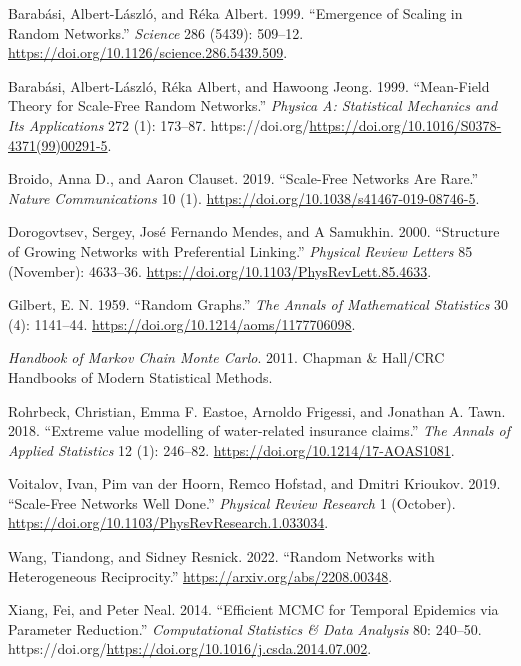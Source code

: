\documentclass[
]{article}
\newlength{\cslhangindent}
\newenvironment{CSLReferences}[2] %
 {\begin{list}{}{%
  \setlength{\itemindent}{0pt}
  \setlength{\leftmargin}{0pt}
  \setlength{\parsep}{0pt}
  \ifodd #1
   \setlength{\leftmargin}{\cslhangindent}
   \setlength{\itemindent}{-1\cslhangindent}
  \fi
  \setlength{\itemsep}{#2\baselineskip}}}
 {\end{list}}
\begin{document}
\label{refs}
\begin{CSLReferences}{1}{0}
Barabási, Albert-László, and Réka Albert. 1999. {``Emergence of Scaling
in Random Networks.''} \emph{Science} 286 (5439): 509--12.
\url{https://doi.org/10.1126/science.286.5439.509}.

Barabási, Albert-László, Réka Albert, and Hawoong Jeong. 1999.
{``Mean-Field Theory for Scale-Free Random Networks.''} \emph{Physica A:
Statistical Mechanics and Its Applications} 272 (1): 173--87.
https://doi.org/\url{https://doi.org/10.1016/S0378-4371(99)00291-5}.

Broido, Anna D., and Aaron Clauset. 2019. {``Scale-Free Networks Are
Rare.''} \emph{Nature Communications} 10 (1).
\url{https://doi.org/10.1038/s41467-019-08746-5}.

Dorogovtsev, Sergey, José Fernando Mendes, and A Samukhin. 2000.
{``Structure of Growing Networks with Preferential Linking.''}
\emph{Physical Review Letters} 85 (November): 4633--36.
\url{https://doi.org/10.1103/PhysRevLett.85.4633}.

Gilbert, E. N. 1959. {``{Random Graphs}.''} \emph{The Annals of
Mathematical Statistics} 30 (4): 1141--44.
\url{https://doi.org/10.1214/aoms/1177706098}.

\emph{Handbook of Markov Chain Monte Carlo}. 2011. Chapman \& Hall/CRC
Handbooks of Modern Statistical Methods.

Rohrbeck, Christian, Emma F. Eastoe, Arnoldo Frigessi, and Jonathan A.
Tawn. 2018. {``{Extreme value modelling of water-related insurance
claims}.''} \emph{The Annals of Applied Statistics} 12 (1): 246--82.
\url{https://doi.org/10.1214/17-AOAS1081}.

Voitalov, Ivan, Pim van der Hoorn, Remco Hofstad, and Dmitri Krioukov.
2019. {``Scale-Free Networks Well Done.''} \emph{Physical Review
Research} 1 (October).
\url{https://doi.org/10.1103/PhysRevResearch.1.033034}.

Wang, Tiandong, and Sidney Resnick. 2022. {``Random Networks with
Heterogeneous Reciprocity.''} \url{https://arxiv.org/abs/2208.00348}.

Xiang, Fei, and Peter Neal. 2014. {``Efficient MCMC for Temporal
Epidemics via Parameter Reduction.''} \emph{Computational Statistics \&
Data Analysis} 80: 240--50.
https://doi.org/\url{https://doi.org/10.1016/j.csda.2014.07.002}.

\end{CSLReferences}
\end{document}
